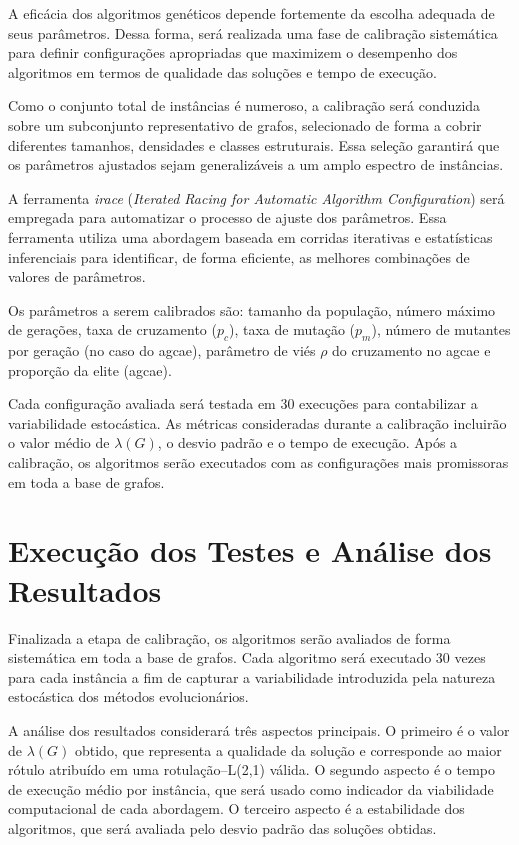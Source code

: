A eficácia dos algoritmos genéticos depende fortemente da escolha adequada de seus parâmetros. Dessa forma, será realizada uma fase de calibração sistemática para definir configurações apropriadas que maximizem o desempenho dos algoritmos em termos de qualidade das soluções e tempo de execução.

Como o conjunto total de instâncias é numeroso, a calibração será conduzida sobre um subconjunto representativo de grafos, selecionado de forma a cobrir diferentes tamanhos, densidades e classes estruturais. Essa seleção garantirá que os parâmetros ajustados sejam generalizáveis a um amplo espectro de instâncias.

A ferramenta \textit{irace} (\textit{Iterated Racing for Automatic Algorithm Configuration}) será empregada para automatizar o processo de ajuste dos parâmetros. Essa ferramenta utiliza uma abordagem baseada em corridas iterativas e estatísticas inferenciais para identificar, de forma eficiente, as melhores combinações de valores de parâmetros.

Os parâmetros a serem calibrados são: tamanho da população, número máximo de gerações, taxa de cruzamento ($p_c$), taxa de mutação ($p_m$), número de mutantes por geração (no caso do \gls{agcae}), parâmetro de viés $\rho$ do cruzamento no \gls{agcae} e proporção da elite (\gls{agcae}).

Cada configuração avaliada será testada em 30 execuções para contabilizar a variabilidade estocástica. As métricas consideradas durante a calibração incluirão o valor médio de $\lambda(G)$, o desvio padrão e o tempo de execução. Após a calibração, os algoritmos serão executados com as configurações mais promissoras em toda a base de grafos.

\section{Execução dos Testes e Análise dos Resultados}

Finalizada a etapa de calibração, os algoritmos serão avaliados de forma sistemática em toda a base de grafos. Cada algoritmo será executado 30 vezes para cada instância a fim de capturar a variabilidade introduzida pela natureza estocástica dos métodos evolucionários.

A análise dos resultados considerará três aspectos principais. O primeiro é o valor de $\lambda(G)$ obtido, que representa a qualidade da solução e corresponde ao maior rótulo atribuído em uma rotulação–L(2,1) válida. O segundo aspecto é o tempo de execução médio por instância, que será usado como indicador da viabilidade computacional de cada abordagem. O terceiro aspecto é a estabilidade dos algoritmos, que será avaliada pelo desvio padrão das soluções obtidas.

